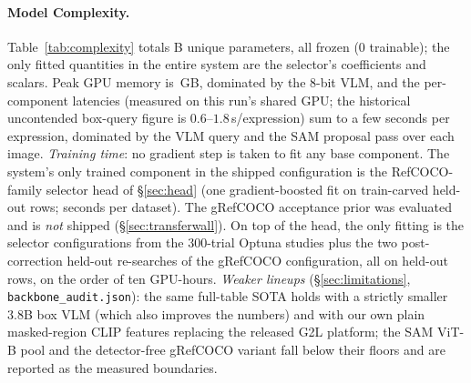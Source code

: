 \paragraph{Model Complexity.}
Table~\ref{tab:complexity} totals \cxParams{}B unique parameters, all frozen
(0 trainable); the only fitted quantities in the entire system are the
selector's \cxFitted{} coefficients and scalars. Peak GPU memory is
\cxPeak{}\,GB, dominated by the 8-bit VLM, and the per-component latencies
(measured on this run's shared GPU; the historical uncontended box-query
figure is $0.6$--$1.8$\,s/expression) sum to a few seconds per expression,
dominated by the VLM query and the SAM proposal pass over each image.
\emph{Training time}: no gradient step is taken to fit any base component.
The system's only trained component in the shipped configuration is the
RefCOCO-family selector head of \S\ref{sec:head} (one gradient-boosted fit on
train-carved held-out rows; seconds per dataset). The gRefCOCO acceptance
prior was evaluated and is \emph{not} shipped (\S\ref{sec:transferwall}).
On top of the head, the only fitting is the selector configurations from the
300-trial Optuna studies plus the two post-correction held-out re-searches of the
gRefCOCO configuration, all on held-out rows, on the order of ten GPU-hours. \emph{Weaker lineups} (\S\ref{sec:limitations},
\texttt{backbone\_audit.json}): the same full-table SOTA holds with a
strictly smaller 3.8B box VLM (which also improves the numbers) and with our
own plain masked-region CLIP features replacing the released G2L platform;
the SAM ViT-B pool and the detector-free gRefCOCO variant fall below their
floors and are reported as the measured boundaries.

\begin{table}[t]\centering\small
\caption{Model Complexity: parameters, estimated FLOPs per query, peak memory
and latency; FLOPs are analytical estimates (2$\times$MACs) with assumptions
stated in \texttt{complexity.json}.}\label{tab:complexity}

\end{table}

